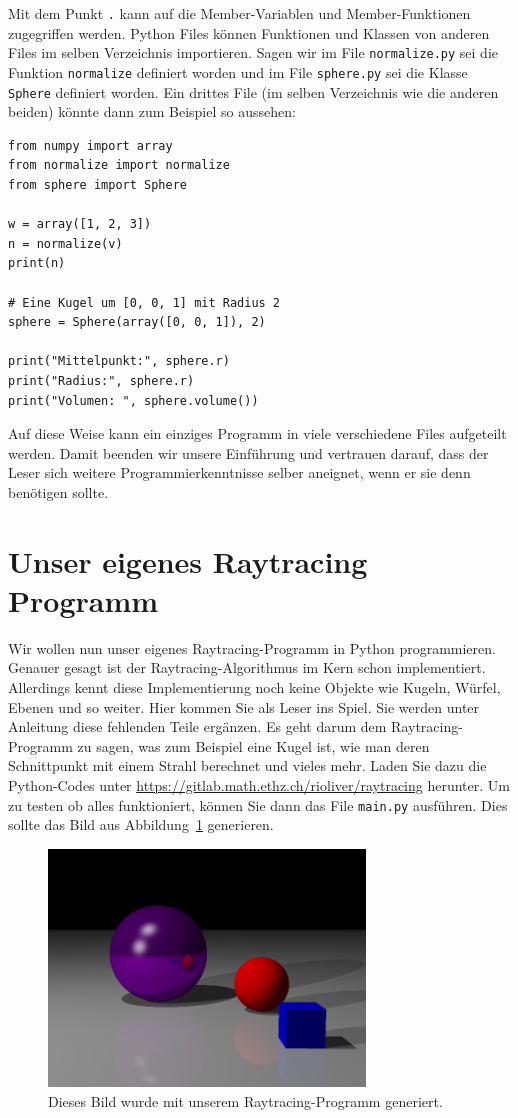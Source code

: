 \documentclass[12pt,a4paper]{article}
\theoremstyle{definition}
\theoremstyle{definition}
\begin{document}
Mit dem Punkt \texttt{.} kann auf die Member-Variablen und Member-Funktionen zugegriffen werden.
Python Files können Funktionen und Klassen von anderen Files im selben Verzeichnis importieren.
Sagen wir im File \texttt{normalize.py} sei die Funktion \texttt{normalize} definiert worden und im File \texttt{sphere.py} sei die Klasse \texttt{Sphere} definiert worden.
Ein drittes File (im selben Verzeichnis wie die anderen beiden) könnte dann zum Beispiel so aussehen:
\begin{lstlisting}[style=python]
from numpy import array
from normalize import normalize
from sphere import Sphere

w = array([1, 2, 3])
n = normalize(v)
print(n)

# Eine Kugel um [0, 0, 1] mit Radius 2
sphere = Sphere(array([0, 0, 1]), 2)

print("Mittelpunkt:", sphere.r)
print("Radius:", sphere.r)
print("Volumen: ", sphere.volume())
\end{lstlisting}
Auf diese Weise kann ein einziges Programm in viele verschiedene Files aufgeteilt werden.
Damit beenden wir unsere Einführung und vertrauen darauf, dass der Leser sich weitere Programmierkenntnisse selber aneignet, wenn er sie denn benötigen sollte.

\section{Unser eigenes Raytracing Programm}
Wir wollen nun unser eigenes Raytracing-Programm in Python programmieren.
Genauer gesagt ist der Raytracing-Algorithmus im Kern schon implementiert.
Allerdings kennt diese Implementierung noch keine Objekte wie Kugeln, Würfel, Ebenen und so weiter.
Hier kommen Sie als Leser ins Spiel.
Sie werden unter Anleitung diese fehlenden Teile ergänzen.
Es geht darum dem Raytracing-Programm zu sagen, was zum Beispiel eine Kugel ist, wie man deren Schnittpunkt mit einem Strahl berechnet und vieles mehr.
Laden Sie dazu die Python-Codes unter \url{https://gitlab.math.ethz.ch/rioliver/raytracing} herunter.
Um zu testen ob alles funktioniert, können Sie dann das File \texttt{main.py} ausführen. Dies sollte das Bild aus Abbildung~\ref{fig:goal} generieren.
\begin{figure}[h!]
	\centering
	\includegraphics[width=0.75\textwidth]{images/outlook.png}
	\caption{Dieses Bild wurde mit unserem Raytracing-Programm generiert.}
	\label{fig:goal}
\end{figure}
\end{document}
